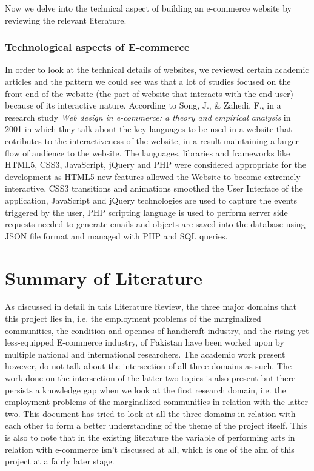 Now we delve into the technical aspect of building an e-commerce website by reviewing the relevant literature.

\subsubsection {Technological aspects of E-commerce}

In order to look at the technical details of websites, we reviewed certain academic articles and the pattern we could see was that a lot of studies focused on the front-end of the website (the part of website that interacts with the end user) because of its interactive nature. According to Song, J., \& Zahedi, F., in a research study \textit {Web design in e-commerce: a theory and empirical analysis} in 2001 in which they talk about the key languages to be used in a website that cotributes to the interactiveness of the website, in a result maintaining a larger flow of audience to the website. The languages, libraries and frameworks like HTML5, CSS3, JavaScript, jQuery and PHP were considered appropriate for the development as HTML5 new features allowed the Website to become extremely interactive, CSS3 transitions and animations smoothed the User Interface of the application, JavaScript and jQuery technologies are used to capture the events triggered by the user, PHP scripting language is used to perform server side requests needed to generate emails and objects are saved into the database using JSON file format and managed with PHP and SQL queries.





\section{Summary of Literature}

As discussed in detail in this Literature Review, the three major domains that this project lies in, i.e. the employment problems of the marginalized communities, the condition and opennes of handicraft industry, and the rising yet less-equipped E-commerce industry, of Pakistan have been worked upon by multiple national and international researchers. The academic work present however, do not talk about the intersection of all three domains as such. The work done on the intersection of the latter two topics is also present but there persists a knowledge gap when we look at the first research domain, i.e. the employment problems of the marginalized communities in relation with the latter two. This document has tried to look at all the three domains in relation with each other to form a better understanding of the theme of the project itself. This is also to note that in the existing literature the variable of performing arts in relation with e-commerce isn't discussed at all, which is one of the aim of this project at a fairly later stage. 

